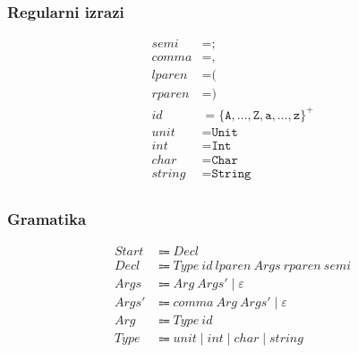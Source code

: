 \documentclass{report}
\newcommand{\Null}{\varepsilon}
\newcommand{\Char}[1]{\texttt{#1}}
\newcommand{\Spc}{\ }
\newcommand{\Union}{\mathrel{|}}
\newcommand{\KleenePlus}[1]{#1^+}
\newcommand{\Arrow}{\Coloneq}
\newcommand{\NT}[1]{{#1}}
\newcommand{\T}[1]{{#1}}
\begin{document}
\subsubsection*{Regularni izrazi}
\begin{equation*}
  \begin{aligned}
    \T{semi} &= \Char{;}\\
    \T{comma} &= \Char{,}\\
    \T{lparen} &= \Char{(}\\
    \T{rparen} &= \Char{)}\\
    \T{id} &= \KleenePlus{\{\Char{A}, \dots, \Char{Z}, \Char{a}, \dots, \Char{z}\}}\\
    \T{unit} &= \Char{Unit}\\
    \T{int} &= \Char{Int}\\
    \T{char} &= \Char{Char}\\
    \T{string} &= \Char{String}\\
  \end{aligned}
\end{equation*}

\subsubsection*{Gramatika}
\begin{equation*}
  \begin{aligned}
    \NT{Start} &\Arrow \NT{Decl}\\
    \NT{Decl} &\Arrow \NT{Type} \Spc \T{id} \Spc \T{lparen} \Spc \NT{Args} \Spc \T{rparen} \Spc \T{semi}\\
    \NT{Args} &\Arrow \NT{Arg} \Spc \NT{Args'} \Union \Null\\
    \NT{Args'} &\Arrow \T{comma} \Spc \NT{Arg} \Spc \NT{Args'} \Union \Null\\
    \NT{Arg} &\Arrow \NT{Type} \Spc \T{id}\\
    \NT{Type} &\Arrow \T{unit} \Union \T{int} \Union \T{char} \Union \T{string}\\
  \end{aligned}
\end{equation*}
\end{document}
